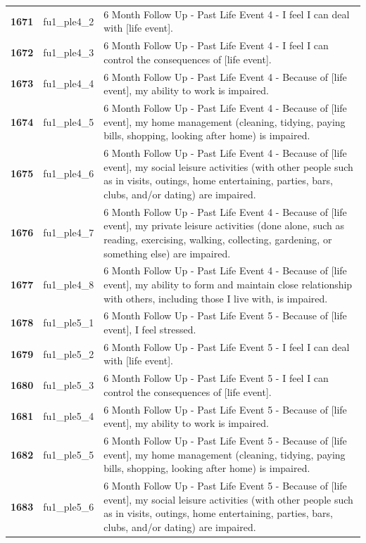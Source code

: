 \documentclass[
  letterpaper,
  DIV=11,
  numbers=noendperiod]{scrartcl}
\begin{document}
\begin{longtable}[t]{>{}cll}
\addlinespace
\textbf{1671} & fu1\_ple4\_2 & 6 Month Follow Up - Past Life Event 4 - I feel I can deal with [life event].\\
\textbf{1672} & fu1\_ple4\_3 & 6 Month Follow Up - Past Life Event 4 - I feel I can control the consequences of [life event].\\
\textbf{1673} & fu1\_ple4\_4 & 6 Month Follow Up - Past Life Event 4 - Because of [life event], my ability to work is impaired.\\
\textbf{1674} & fu1\_ple4\_5 & 6 Month Follow Up - Past Life Event 4 - Because of [life event], my home management (cleaning, tidying, paying bills, shopping, looking after home)  is impaired.\\
\textbf{1675} & fu1\_ple4\_6 & 6 Month Follow Up - Past Life Event 4 - Because of [life event], my social leisure activities (with other people such as in visits, outings, home entertaining, parties, bars, clubs, and/or dating) are impaired.\\
\addlinespace
\textbf{1676} & fu1\_ple4\_7 & 6 Month Follow Up - Past Life Event 4 - Because of [life event], my private leisure activities (done alone, such as reading, exercising, walking, collecting, gardening, or something else) are impaired.\\
\textbf{1677} & fu1\_ple4\_8 & 6 Month Follow Up - Past Life Event 4 - Because of [life event], my ability to form and maintain close relationship with others, including those I live with, is impaired.\\
\textbf{1678} & fu1\_ple5\_1 & 6 Month Follow Up - Past Life Event 5 - Because of [life event], I feel stressed.\\
\textbf{1679} & fu1\_ple5\_2 & 6 Month Follow Up - Past Life Event 5 - I feel I can deal with [life event].\\
\textbf{1680} & fu1\_ple5\_3 & 6 Month Follow Up - Past Life Event 5 - I feel I can control the consequences of [life event].\\
\addlinespace
\textbf{1681} & fu1\_ple5\_4 & 6 Month Follow Up - Past Life Event 5 - Because of [life event], my ability to work is impaired.\\
\textbf{1682} & fu1\_ple5\_5 & 6 Month Follow Up - Past Life Event 5 - Because of [life event], my home management (cleaning, tidying, paying bills, shopping, looking after home)  is impaired.\\
\textbf{1683} & fu1\_ple5\_6 & 6 Month Follow Up - Past Life Event 5 - Because of [life event], my social leisure activities (with other people such as in visits, outings, home entertaining, parties, bars, clubs, and/or dating) are impaired.\\

\end{longtable}
\end{document}
